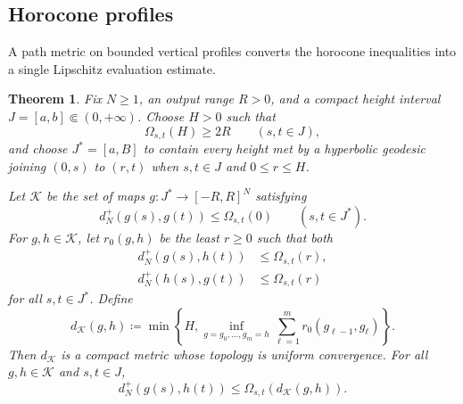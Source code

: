 \documentclass[10pt,a4paper]{amsart}
\numberwithin{equation}{section}
\newtheorem{theorem}{Theorem}[section]
\begin{document}
\subsection{Horocone profiles}

A path metric on bounded vertical profiles converts the horocone inequalities into a single Lipschitz evaluation estimate.

\begin{theorem}\label{thm:profile-path-metric}
Fix $N\ge1$, an output range $R>0$, and a compact height interval $J=[a,b]\Subset(0,+\infty)$.  Choose $H>0$ such that
\begin{equation}\label{eq:H-output-cutoff} \Omega_{s,t}(H)\ge2R \qquad(s,t\in J), \end{equation}
and choose $J^*=[a,B]$ to contain every height met by a hyperbolic geodesic joining $(0,s)$ to $(r,t)$ when $s,t\in J$ and $0\le r\le H$.

Let $\mathscr K$ be the set of maps $g\colon J^*\to[-R,R]^N$ satisfying
\begin{equation}\label{eq:vertical-profile-constraint} d_N^+(g(s),g(t))\le\Omega_{s,t}(0) \qquad(s,t\in J^*). \end{equation}
For $g,h\in\mathscr K$, let $r_0(g,h)$ be the least $r\ge0$ such that both
\begin{align*}
 d_N^+(g(s),h(t))&\le\Omega_{s,t}(r),\\
 d_N^+(h(s),g(t))&\le\Omega_{s,t}(r)
\end{align*}
for all $s,t\in J^*$.  Define
\begin{equation}\label{eq:profile-path-metric} d_{\mathscr K}(g,h) \coloneqq\min\left\{H, \inf_{g=g_0,\ldots,g_m=h} \sum_{\ell=1}^mr_0(g_{\ell-1},g_\ell)\right\}. \end{equation}
Then $d_{\mathscr K}$ is a compact metric whose topology is uniform convergence.  For all $g,h\in\mathscr K$ and $s,t\in J$,
\begin{equation}\label{eq:evaluation-cone-inequality} d_N^+(g(s),h(t)) \le\Omega_{s,t}(d_{\mathscr K}(g,h)). \end{equation}
\end{theorem}
\end{document}
